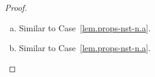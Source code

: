 \begin{proof}
\begin{enumerate}[(a)]
  \item Similar to Case~\eqref{lem.props-nst-n.a}.

  \item Similar to Case~\eqref{lem.props-nst-n.a}.


\end{enumerate}
\end{proof}
